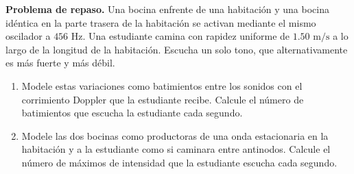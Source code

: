 \item \textbf{Problema de repaso.}
Una bocina enfrente de una habitación y una bocina idéntica en la parte trasera de la habitación se activan mediante el mismo oscilador a $456\text{ Hz}$. Una estudiante camina con rapidez uniforme de $1.50\text{ m/s}$ a lo largo de la longitud de la habitación. Escucha un solo tono, que alternativamente es más fuerte y más débil.
\begin{enumerate}
    \item Modele estas variaciones como batimientos entre los sonidos con el corrimiento Doppler que la estudiante recibe. Calcule el número de batimientos que escucha la estudiante cada segundo.
    \item Modele las dos bocinas como productoras de una onda estacionaria en la habitación y a la estudiante como si caminara entre antinodos. Calcule el número de máximos de intensidad que la estudiante escucha cada segundo.
\end{enumerate}